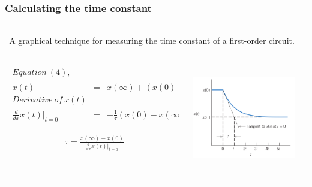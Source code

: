 \documentclass[aspectratio=169]{beamer}
\begin{document}
\begin{frame}[fragile]
	\frametitle{Calculating the time constant}

		\begin{tabular}{cc}
		\begin{columns}
				\begin{column}{1\textwidth}  %
				 	A graphical technique for
measuring the time constant of a first-order circuit.
				\end{column}
						\end{columns}\\		

				\begin{columns}
				\begin{column}{.5\textwidth}  %
\small	\begin{eqnarray}
	\nonumber Equation \ (4),\\
	\nonumber	 x(t)&=&x(\infty)+(x(0)-x(\infty)) e^{-\frac{t}{\tau}}\\ 
	\nonumber Derivative \ of\ x(t) \\
	\nonumber	\frac{d}{dx}x(t) \Big|_{t=0}&=& -\frac{1}{\tau}(x(0)-x(\infty)) e^{-\frac{t}{\tau}} \Big|_{t=0} \\ 	\nonumber
	\end{eqnarray} 
\begin{center}
 \LARGE $\tau = \frac{x(\infty)-x(0)}{\frac{d}{dx}x(t)  \Big|_{t=0}}$
\end{center}				\end{column}
				\begin{column}{.4\textwidth}  %
					\center			  \includegraphics[width=6cm,height=4.5cm]{figure15.png}

				\end{column}
			\end{columns}\\	

					
\end{tabular}	
\end{frame}
\end{document}

